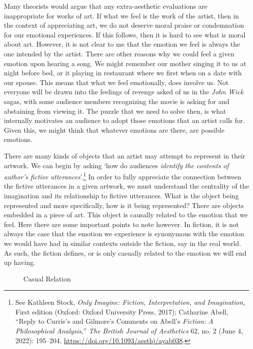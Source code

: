 \documentclass[phdthesis,12pt,final,a4paper]{wuthesis}
\theoremstyle{definition}
\theoremstyle{definition}
\theoremstyle{definition}
\theoremstyle{definition}
\theoremstyle{remark}
\begin{document}
Many theorists would argue that any extra-aesthetic evaluations are inappropriate for works of art. If what we feel is the work of the artist, then in the context of appreciating art, we do not deserve moral praise or condemnation for our emotional experiences. If this follows, then it is hard to see what is moral about art. However, it is not clear to me that the emotion we feel is always the one intended by the artist. There are other reasons why we could feel a given emotion upon hearing a song. We might remember our mother singing it to us at night before bed, or it playing in restaurant where we first when on a date with our spouse. This means that what we feel emotionally, does involve us. Not everyone will be drawn into the feelings of revenge asked of us in the \emph{John Wick} sagas, with some audience members recognizing the movie is asking for and abstaining from viewing it. The puzzle that we need to solve then, is what internally motivates an audience to adopt those emotions that an artist calls for. Given this, we might think that whatever emotions are there, are possible emotions.

There are many kinds of objects that an artist may attempt to represent in their artwork. We can begin by asking `how do audiences \emph{identify the contents of author's fictive utterances}'.\footnote{See Kathleen Stock, \emph{Only Imagine: Fiction, Interpretation, and Imagination}, First edition (Oxford: Oxford University Press, 2017); Catharine Abell, {``Reply to {Currie}'s and {Gilmore}'s Comments on {Abell}'s {\emph{Fiction}}{\emph{:} }{\emph{A Philosophical Analysis}},''} \emph{The British Journal of Aesthetics} 62, no. 2 (June 4, 2022): 195--204, \url{https://doi.org/10.1093/aesthj/ayab038}.} In order to fully appreciate the connection between the fictive utterances in a given artwork, we must understand the centrality of the imagination and its relationship to fictive utterances. What is the object being represented and more specifically, how is it being represented? There are objects embedded in a piece of art. This object is causally related to the emotion that we feel. Here there are some important points to note however. In fiction, it is not always the case that the emotion we experience is synonymous with the emotion we would have had in similar contexts outside the fiction, say in the real world. As such, the fiction defines, or is only casually related to the emotion we will end up having.

\begin{figure}
\centering
\caption{Casual Relation}
\label{fig:casual}
\end{figure}
\end{document}
